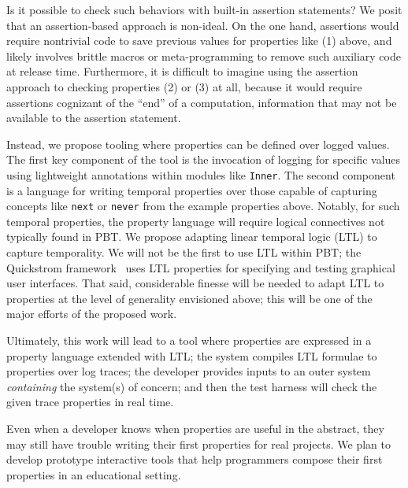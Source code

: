 Is it possible to check such behaviors with built-in assertion statements? We
posit that an assertion-based approach is non-ideal. On the one hand, assertions
would require nontrivial code to save previous values for properties like (1)
above, and likely involves brittle macros or meta-programming to remove such
auxiliary code at release time. Furthermore, it is difficult to imagine using
the assertion approach to checking properties (2) or (3) at all, because it
would require assertions cognizant of the ``end'' of a computation, information
that may not be available to the assertion statement.

Instead, we propose tooling where properties can be defined over logged values.
The first key component of the tool is the invocation of
logging for specific values using lightweight annotations within modules like
\lstinline{Inner}. The second component is a language for writing temporal
properties over those capable of capturing concepts like \lstinline{next} or
\lstinline{never} from the example properties above. Notably, for such temporal
properties, the property language will require logical connectives not typically
found in PBT. We propose adapting linear temporal logic (LTL) to capture
temporality. We will not be the first to use LTL within PBT; the Quickstrom
framework~\cite{oconnor_quickstrom_2022} uses LTL properties
for specifying and testing graphical user interfaces. That said, considerable
finesse will be needed to adapt LTL to properties at the level of generality
envisioned above; this will be one of the major efforts of the proposed work.

Ultimately, this work will lead to a tool where properties are expressed in a
property language extended with LTL; the system compiles LTL formulae to
properties over log traces; the developer provides inputs to an outer system
\emph{containing} the system(s) of concern; and then the test harness will check
the given trace properties in real time.


\iflater{}
\fi
%
Even when a developer knows when properties are useful in the abstract,
they may still have trouble writing their first properties
for real projects. We plan to develop prototype interactive tools that help
programmers compose their first properties in an educational setting.

